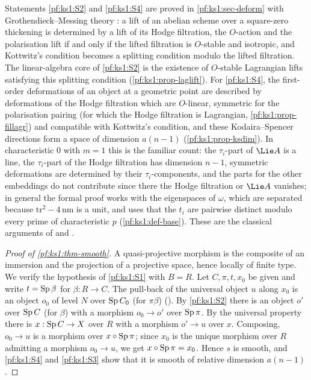 Statements \ref{pf:ks1:S2} and \ref{pf:ks1:S4} are proved in \cref{pf:ks1:sec-deform} with Grothendieck--Messing theory
\cite{Messing1972}: a lift of an abelian scheme over a square-zero thickening is determined by a lift of its Hodge filtration, the
$O$-action and the polarisation lift if and only if the lifted filtration is $O$-stable and isotropic, and Kottwitz's condition
becomes a splitting condition modulo the lifted filtration. The linear-algebra core of \ref{pf:ks1:S2} is the existence of
$O$-stable Lagrangian lifts satisfying this splitting condition (\cref{pf:ks1:prop-laglift}). For \ref{pf:ks1:S4}, the first-order
deformations of an object at a geometric point are described by deformations of the Hodge filtration which are $O$-linear,
symmetric for the polarisation pairing (for which the Hodge filtration is Lagrangian, \cref{pf:ks1:prop-fillagr}) and compatible
with Kottwitz's condition, and these Kodaira--Spencer directions form a space of dimension $a(n-1)$ (\cref{pf:ks1:prop-ksdim}). In
characteristic $0$ with $m=1$ this is the familiar count: the $\tau_i$-part of $\Lie A$ is a line, the $\tau_i$-part of the Hodge
filtration has dimension $n-1$, symmetric deformations are determined by their $\tau_i$-components, and the parts for the other
embeddings do not contribute since there the Hodge filtration or $\Lie A$ vanishes; in general the formal proof works with the
eigenspaces of $\omega$, which are separated because $\mathrm{tr}^2-4\,\mathrm{nm}$ is a unit, and uses that the $t_i$ are pairwise
distinct modulo every prime of characteristic $p$ (\cref{pf:ks1:def-base}). These are the classical arguments of
\cite[\S5]{Kottwitz1992} and \cite[Ch.~2]{Lan2013}.

\begin{proof}[Proof of \cref{pf:ks1:thm-smooth}]
A quasi-projective morphism is the composite of an immersion and the projection of a projective space, hence
locally of finite type. We verify the hypothesis of \ref{pf:ks1:S1} with $B=R$. Let $C,\pi,t,x_0$ be given and
write $t=\operatorname{Sp}\beta$ for $\beta:R\to C$. The pull-back of the universal object $u$ along $x_0$ is an object
$o_0$ of level $N$ over $\operatorname{Sp} C_0$ (for $\pi\beta$)
(). By \ref{pf:ks1:S2} there is an object $o'$ over
$\operatorname{Sp} C$ (for $\beta$) with a morphism $o_0\to o'$ over $\operatorname{Sp}\pi$. By the universal property there is
$x:\operatorname{Sp} C\to X$ over $R$ with a morphism $o'\to u$ over $x$. Composing, $o_0\to u$ is a morphism over
$x\circ\operatorname{Sp}\pi$; since $x_0$ is the unique morphism over $R$ admitting a morphism $o_0\to u$, we get
$x\circ\operatorname{Sp}\pi=x_0$. Hence $s$ is smooth, and \ref{pf:ks1:S4} and \ref{pf:ks1:S3} show that it is smooth of
relative dimension $a(n-1)$.
\end{proof}

